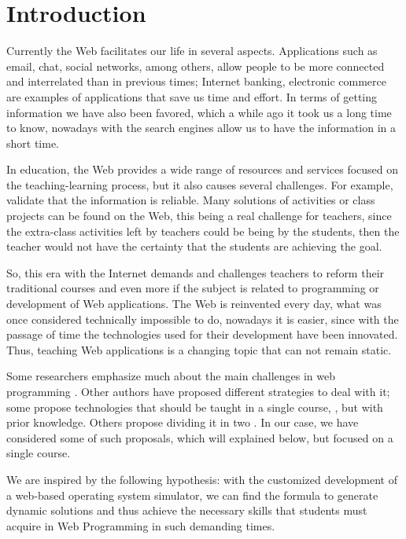 \section{Introduction}
\label{sec:intro}

Currently the Web facilitates our life in several aspects. Applications such as 
email, chat, social networks, among others, allow people to be more connected 
and interrelated than in previous times; Internet banking, electronic commerce 
are examples of applications that save us time and effort. In terms of getting 
information we have also been favored, which a while ago it took us a long time 
to know, nowadays with the search engines allow us to have the information in a 
short time.

In education, the Web provides a wide range of resources and services focused on 
the teaching-learning process, but it also causes several challenges. For example, 
validate that the information is reliable. Many solutions of activities or class 
projects can be found on the Web, this being a real challenge for teachers, since 
the extra-class activities left by teachers could be being by the students, then 
the teacher would not have the certainty that the students are achieving the goal.

So, this era with the Internet demands and challenges teachers to reform their 
traditional courses and even more if the subject is related to programming or 
development of Web applications. The Web is reinvented every day, what was once 
considered technically impossible to do, nowadays it is easier, since with the 
passage of time the technologies used for their development have been innovated. 
Thus, teaching Web applications is a changing topic that can not remain static.

Some researchers emphasize much about the main challenges in web programming 
\cite{9Wang2009,7XinogalosK2012,4Liu2011}. Other authors have proposed different 
strategies to deal with it; some propose technologies that should be taught in a 
single course, \cite{4Liu2011,10Rosenbloom2017}, but with prior knowledge. Others 
propose dividing it in two \cite{9Wang2009}. In our case, we have considered some 
of such proposals, which will explained below, but focused on a single course.

We are inspired by the following hypothesis: with the customized development of a 
web-based operating system simulator, we can find the formula to generate dynamic 
solutions and thus achieve the necessary skills that students must acquire in Web 
Programming in such demanding times.

